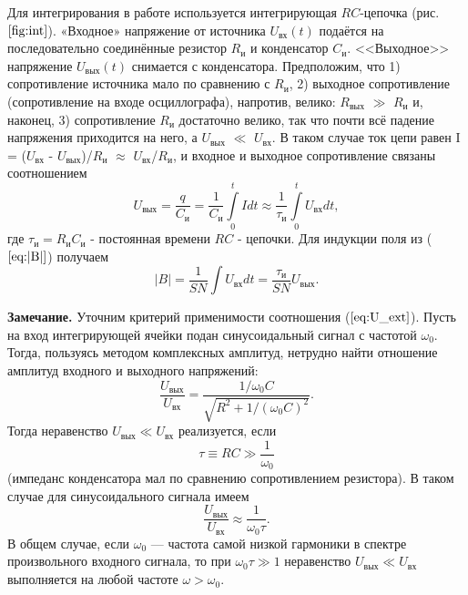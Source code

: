 \documentclass[12pt,a4paper]{article}
\begin{document}
Для интегрирования в работе используется интегрирующая $ RC $-цепочка (рис. $ \ref{fig:int} $).
«Входное» напряжение от источника $U_{\text{вх}}(t)$ подаётся на последовательно соединённые резистор $R_\text{и}$ и конденсатор $C_\text{и}$. <<Выходное>>
напряжение $U_{\text{вых}}(t)$ снимается с конденсатора. Предположим, что 1) сопротивление источника мало по сравнению с $R_\text{и}$, 2) выходное сопротивление (сопротивление на входе осциллографа), напротив, велико: $R_{\text{вых}}$ $ \gg $ $R_\text{и}$ и, наконец, 3) сопротивление $R_\text{и}$ достаточно велико, так что почти всё падение напряжения приходится на него, а $U_{\text{вых}}$ $\ll$ $U_{\text{вх}}$. В таком случае ток цепи равен I = ($U_{\text{вх}}$ - $U_{\text{вых}}$)/$R_\text{и}$ $\approx$ $U_{\text{вх}}$/$R_\text{и}$, и входное и выходное сопротивление связаны соотношением
\begin{equation}
U_{\text{вых}} = \frac{q}{C_\text{и}} = \frac{1}{C_\text{и}}\int\limits_0^t Idt \approx \frac{1}{\tau_\text{и}} \int\limits_0^t U_{\text{вх}}dt,
\label{eq:U_ext}
\end{equation}
где $\tau_\text{и}=R_\text{и}C_\text{и}$ - постоянная времени $ RC $ - цепочки. Для индукции поля из ($\ref{eq:|B|}$) получаем 
\begin{equation}
|B|=\frac{1}{SN}\int U_{\text{вх}} dt=\frac{\tau_\text{и}}{SN}U_{\text{вых}}.
\label{eq:|B|new}
\end{equation}

\textbf{Замечание.} Уточним критерий применимости соотношения ($\ref{eq:U_ext}$). Пусть на вход интегрирующей ячейки подан синусоидальный сигнал с частотой $\omega_0$. Тогда, пользуясь методом комплексных амплитуд, нетрудно найти отношение амплитуд входного и выходного напряжений:
\begin{equation}
\frac{U_{\text{вых}}}{U_{\text{вх}}}=\frac{1/\omega_0C}{\sqrt{R^2+1/(\omega_0C)^2}}.
\end{equation}
Тогда неравенство $U_{\text{вых}} \ll U_{\text{вх}}$ реализуется, если 
\begin{equation}
\tau \equiv RC\gg \frac{1}{\omega_0}
\end{equation}
(импеданс конденсатора мал по сравнению сопротивлением резистора).
В таком случае для синусоидального сигнала имеем
\begin{equation}
\frac{U_{\text{вых}}}{U_{\text{вх}}}\approx\frac{1}{\omega_0\tau}.
\end{equation}
В общем случае, если $\omega_0$ — частота самой низкой гармоники в спектре
произвольного входного сигнала, то при $\omega_0\tau \gg 1$ неравенство $U_{\text{вых}} \ll U_{\text{вх}}$ выполняется на любой частоте $\omega > \omega_0$.
\end{document}
